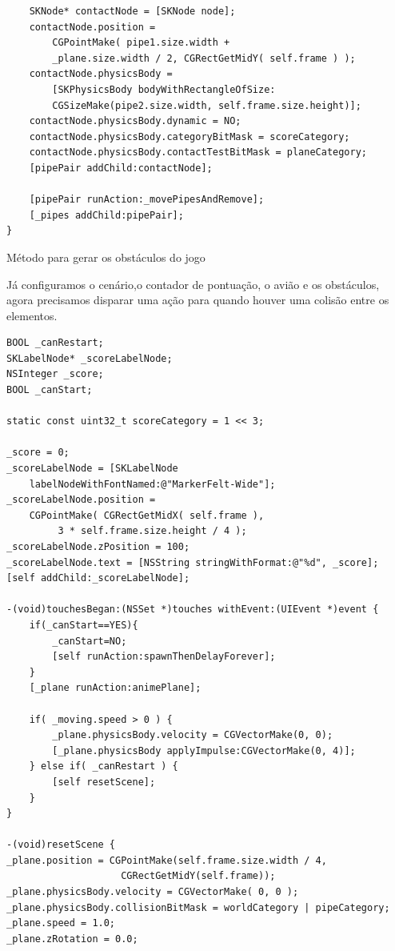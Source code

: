 \documentclass[a4paper,12pt,brazil,doubleside]{book}
\begin{document}
\begin{singlespace}
\begin{listing}[H]
\begin{verbatim}
    SKNode* contactNode = [SKNode node];
    contactNode.position = 
    	CGPointMake( pipe1.size.width + 
		_plane.size.width / 2, CGRectGetMidY( self.frame ) );
    contactNode.physicsBody = 
    	[SKPhysicsBody bodyWithRectangleOfSize:
		CGSizeMake(pipe2.size.width, self.frame.size.height)];
    contactNode.physicsBody.dynamic = NO;
    contactNode.physicsBody.categoryBitMask = scoreCategory;
    contactNode.physicsBody.contactTestBitMask = planeCategory;
    [pipePair addChild:contactNode];
    
    [pipePair runAction:_movePipesAndRemove];
    [_pipes addChild:pipePair];
}
\end{verbatim}
\caption{Método para gerar os obstáculos do jogo}
\end{listing}

Já configuramos o cenário,o contador de pontuação, o avião e os obstáculos, agora precisamos disparar uma ação para quando houver uma colisão entre os elementos.

\begin{listing}[H]
\begin{verbatim}
BOOL _canRestart;
SKLabelNode* _scoreLabelNode;
NSInteger _score;
BOOL _canStart;

static const uint32_t scoreCategory = 1 << 3;

_score = 0;
_scoreLabelNode = [SKLabelNode 
	labelNodeWithFontNamed:@"MarkerFelt-Wide"];
_scoreLabelNode.position = 
	CGPointMake( CGRectGetMidX( self.frame ),
		 3 * self.frame.size.height / 4 );
_scoreLabelNode.zPosition = 100;
_scoreLabelNode.text = [NSString stringWithFormat:@"%d", _score];
[self addChild:_scoreLabelNode];
       
-(void)touchesBegan:(NSSet *)touches withEvent:(UIEvent *)event {
    if(_canStart==YES){
        _canStart=NO;
        [self runAction:spawnThenDelayForever];
    }
    [_plane runAction:animePlane];
    
    if( _moving.speed > 0 ) {
        _plane.physicsBody.velocity = CGVectorMake(0, 0);
        [_plane.physicsBody applyImpulse:CGVectorMake(0, 4)];
    } else if( _canRestart ) {
        [self resetScene];
    }
}

-(void)resetScene {
_plane.position = CGPointMake(self.frame.size.width / 4, 
					CGRectGetMidY(self.frame));
_plane.physicsBody.velocity = CGVectorMake( 0, 0 );
_plane.physicsBody.collisionBitMask = worldCategory | pipeCategory;
_plane.speed = 1.0;
_plane.zRotation = 0.0;
    

\end{verbatim}
\end{listing}
\end{singlespace}
\end{document}

